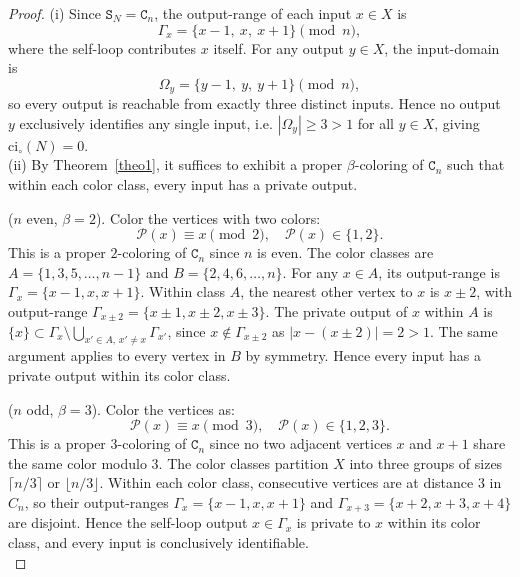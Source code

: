 \documentclass[12pt,a4paper]{article}
\begin{document}
\begin{proof}
(i) Since $\mathtt{S}_N =\mathtt{C}_n$, the output-range of each input $x \in X$ is
\begin{equation*}
\Gamma_x = \{x-1,\ x,\ x+1\} \pmod{n},
\end{equation*}
where the self-loop contributes $x$ itself. For any output $y \in X$, the input-domain is
\begin{equation*}
\Omega_y = \{y-1,\ y,\ y+1\} \pmod{n},
\end{equation*}
so every output is reachable from exactly three distinct inputs. Hence no output $y$ exclusively identifies any single input, i.e. $|\Omega_y| \geq 3 > 1$ for all $y \in X$, giving $\mathrm{ci}_\circ(N) = 0$.\\

\noindent (ii) By Theorem~\ref{theo1}, it suffices to exhibit a proper $\beta$-coloring of $\mathtt{C}_n$ such that within each color class, every input has a private output.

 ($n$ even, $\beta = 2$). Color the vertices with two colors:
\begin{equation*}
\mathcal{P}(x) \equiv x \pmod{2},\quad \mathcal{P}(x) \in \{1, 2\}.
\end{equation*}
This is a proper $2$-coloring of $\mathtt{C}_n$ since $n$ is even. The color classes are $A = \{1, 3, 5, \ldots, n-1\}$ and $B = \{2, 4, 6, \ldots, n\}$. For any $x \in A$, its output-range is $\Gamma_x = \{x-1, x, x+1\}$. Within class $A$, the nearest other vertex to $x$ is $x \pm 2$, with output-range $\Gamma_{x \pm 2} = \{x\pm1, x\pm2, x\pm3\}$. The private output of $x$ within $A$ is $\{x\} \subset \Gamma_x \setminus \bigcup_{x' \in A,\, x' \neq x} \Gamma_{x'}$, since $x \notin \Gamma_{x\pm2}$ as $|x - (x\pm2)| = 2 > 1$. The same argument applies to every vertex in $B$ by symmetry. Hence every input has a private output within its color class.

 ($n$ odd, $\beta = 3$). Color the vertices as:
\begin{equation*}
\mathcal{P}(x) \equiv x \pmod{3},\quad \mathcal{P}(x) \in \{1, 2, 3\}.
\end{equation*}
This is a proper $3$-coloring of $\mathtt{C}_n$ since no two adjacent vertices $x$ and $x+1$ share the same color modulo $3$. The color classes partition $X$ into three groups of sizes $\lceil n/3 \rceil$ or $\lfloor n/3\rfloor$. Within each color class, consecutive vertices are at distance $3$ in $C_n$, so their output-ranges $\Gamma_x = \{x-1, x, x+1\}$ and $\Gamma_{x+3} = \{x+2, x+3, x+4\}$ are disjoint. Hence the self-loop output $x \in \Gamma_x$ is private to $x$ within its color class, and every input is conclusively identifiable.\\


\end{proof}
\end{document}
